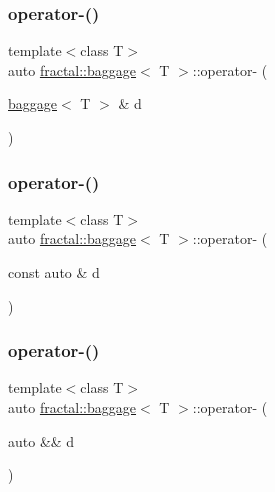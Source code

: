 \mbox{\label{classfractal_1_1baggage_ae3e696df0f617540a076c098387c6df6}} 
\subsubsection{\texorpdfstring{operator-\/()}{operator-()}\hspace{0.1cm}{\footnotesize\ttfamily [1/3]}}
{\footnotesize\ttfamily template$<$class T$>$ \\
auto \hyperlink{classfractal_1_1baggage}{fractal\+::baggage}$<$ T $>$\+::operator-\/ (\begin{DoxyParamCaption}\item[{\hyperlink{classfractal_1_1baggage}{baggage}$<$ T $>$ \&}]{d }\end{DoxyParamCaption})\hspace{0.3cm}{\ttfamily [inline]}}

\mbox{\label{classfractal_1_1baggage_a1c9f2aefd269f9338292f6075a575deb}} 
\subsubsection{\texorpdfstring{operator-\/()}{operator-()}\hspace{0.1cm}{\footnotesize\ttfamily [2/3]}}
{\footnotesize\ttfamily template$<$class T$>$ \\
auto \hyperlink{classfractal_1_1baggage}{fractal\+::baggage}$<$ T $>$\+::operator-\/ (\begin{DoxyParamCaption}\item[{const auto \&}]{d }\end{DoxyParamCaption})\hspace{0.3cm}{\ttfamily [inline]}}

\mbox{\label{classfractal_1_1baggage_ae897641772b637a6627626be213bc02d}} 
\subsubsection{\texorpdfstring{operator-\/()}{operator-()}\hspace{0.1cm}{\footnotesize\ttfamily [3/3]}}
{\footnotesize\ttfamily template$<$class T$>$ \\
auto \hyperlink{classfractal_1_1baggage}{fractal\+::baggage}$<$ T $>$\+::operator-\/ (\begin{DoxyParamCaption}\item[{auto \&\&}]{d }\end{DoxyParamCaption})\hspace{0.3cm}{\ttfamily [inline]}}

